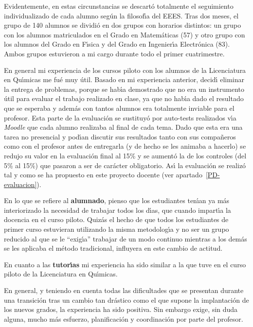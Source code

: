 Evidentemente, en estas circunstancias se descart\'{o} totalmente
 el seguimiento 
individualizado de cada alumno seg\'{u}n la filosof\'{\i}a del EEES.
Tras dos meses, el grupo de 140 alumnos se dividi\'{o} en dos grupos con 
horarios distintos: un grupo con los  alumnos
matriculados en el Grado en Matem\'{a}ticas (57) 
y otro grupo con los alumnos del 
Grado en F\'{\i}sica y del Grado en Ingenier\'{\i}a Electr\'{o}nica (83). Ambos
grupos estuvieron a mi cargo durante todo el primer cuatrimestre.

En general mi experiencia de los cursos piloto con los alumnos 
de la Licenciatura
 en Qu\'{\i}micas me fu\'{e} muy \'{u}til. 
Basado en mi experiencia anterior, decid\'{\i} eliminar la entrega de problemas,
porque se hab\'{\i}a demostrado que no era un instrumento \'{u}til
 para evaluar el trabajo realizado en clase,  ya que no hab\'{\i}a dado 
el resultado que se esperaba y adem\'{a}s con tantos alumnos
era totalmente inviable para el profesor.
Esta parte de la evaluaci\'{o}n se sustituy\'{o} por auto-tests realizados v\'{\i}a
{\it  Moodle} que cada alumno realizaba al final de cada tema. Dado que esta era una tarea 
no presencial y pod\'{\i}an discutir sus resultados tanto con sus compa\~{n}eros
como con el profesor antes de entregarla (y de hecho se les animaba a hacerlo)
se redujo su  valor
 en la evaluaci\'{o}n final al 15\% y se aument\'{o} la de los
controles (del 5\% al 15\%) que pasaron a ser de car\'{a}cter obligatorio.
As\'{\i} la evaluaci\'{o}n se 
realiz\'{o} tal y como se ha propuesto en este proyecto docente 
(ver apartado~\ref{PD-evaluacion}).

En lo que se refiere al {\bf alumnado},
 pienso que los estudiantes ten\'{\i}an ya m\'{a}s
interiorizado  la necesidad  de trabajar todos los d\'{\i}as,
 que cuando impart\'{\i}a la docencia en el
 curso piloto. 
Quiz\'{a}s el hecho de que todos los estudiantes de 
primer curso estuvieran utilizando la misma metodolog\'{\i}a y no ser un grupo reducido
al que se le ``exig\'{\i}a'' trabajar de un modo continuo mientras 
 a los dem\'{a}s 
se les aplicaba  el m\'{e}todo tradicional, influyera en este cambio 
de actitud.

En cuanto a las {\bf  tutor\'{\i}as} 
mi experiencia ha sido similar a la que tuve en el curso
piloto de la Licenciatura en Qu\'{\i}micas. 

En general, y teniendo en cuenta todas las dificultades que se
presentan durante una 
transici\'{o}n tras un cambio tan dr\'{a}stico
 como el que supone la implantaci\'{o}n de los 
nuevos grados,
la experiencia ha sido positiva.
 Sin embargo exige, sin duda alguna, mucho m\'{a}s
 esfuerzo, planificaci\'{o}n y coordinaci\'{o}n por parte del profesor.

